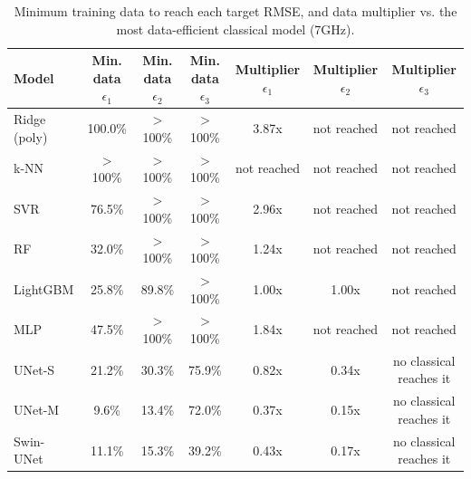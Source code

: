 \begin{table}[t]
\centering
\caption{Minimum training data to reach each target RMSE, and data multiplier vs. the most data-efficient classical model (7GHz).}
\begin{tabular}{lcccccc}
\hline
Model & Min. data $\epsilon_1$ & Min. data $\epsilon_2$ & Min. data $\epsilon_3$ & Multiplier $\epsilon_1$ & Multiplier $\epsilon_2$ & Multiplier $\epsilon_3$ \\
\hline
Ridge (poly) & 100.0\% & $>$100\% & $>$100\% & 3.87x & not reached & not reached \\
k-NN & $>$100\% & $>$100\% & $>$100\% & not reached & not reached & not reached \\
SVR & 76.5\% & $>$100\% & $>$100\% & 2.96x & not reached & not reached \\
RF & 32.0\% & $>$100\% & $>$100\% & 1.24x & not reached & not reached \\
LightGBM & 25.8\% & 89.8\% & $>$100\% & 1.00x & 1.00x & not reached \\
MLP & 47.5\% & $>$100\% & $>$100\% & 1.84x & not reached & not reached \\
UNet-S & 21.2\% & 30.3\% & 75.9\% & 0.82x & 0.34x & no classical reaches it \\
UNet-M & 9.6\% & 13.4\% & 72.0\% & 0.37x & 0.15x & no classical reaches it \\
Swin-UNet & 11.1\% & 15.3\% & 39.2\% & 0.43x & 0.17x & no classical reaches it \\
\hline
\end{tabular}
\end{table}
